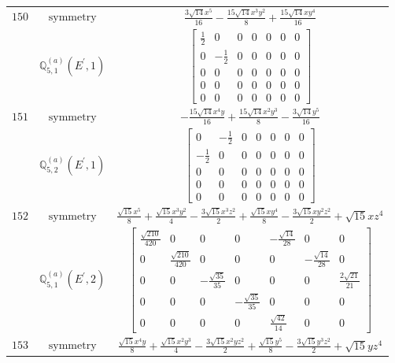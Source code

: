 \documentclass[fleqn,8pt,landscape]{jsarticle}
\begin{document}
\begin{longtable}{ccc}
$ 150 $ & $ \text{symmetry} $ & $ \frac{3 \sqrt{14} x^{5}}{16} - \frac{15 \sqrt{14} x^{3} y^{2}}{8} + \frac{15 \sqrt{14} x y^{4}}{16} $ \\
$  $ & $ \mathbb{Q}_{5,1}^{(a)}(E^{\prime},1) $ & $ \begin{bmatrix} \frac{1}{2} & 0 & 0 & 0 & 0 & 0 & 0 \\ 0 & - \frac{1}{2} & 0 & 0 & 0 & 0 & 0 \\ 0 & 0 & 0 & 0 & 0 & 0 & 0 \\ 0 & 0 & 0 & 0 & 0 & 0 & 0 \\ 0 & 0 & 0 & 0 & 0 & 0 & 0 \end{bmatrix} $ \\ \hline
$ 151 $ & $ \text{symmetry} $ & $ - \frac{15 \sqrt{14} x^{4} y}{16} + \frac{15 \sqrt{14} x^{2} y^{3}}{8} - \frac{3 \sqrt{14} y^{5}}{16} $ \\
$  $ & $ \mathbb{Q}_{5,2}^{(a)}(E^{\prime},1) $ & $ \begin{bmatrix} 0 & - \frac{1}{2} & 0 & 0 & 0 & 0 & 0 \\ - \frac{1}{2} & 0 & 0 & 0 & 0 & 0 & 0 \\ 0 & 0 & 0 & 0 & 0 & 0 & 0 \\ 0 & 0 & 0 & 0 & 0 & 0 & 0 \\ 0 & 0 & 0 & 0 & 0 & 0 & 0 \end{bmatrix} $ \\ \hline
$ 152 $ & $ \text{symmetry} $ & $ \frac{\sqrt{15} x^{5}}{8} + \frac{\sqrt{15} x^{3} y^{2}}{4} - \frac{3 \sqrt{15} x^{3} z^{2}}{2} + \frac{\sqrt{15} x y^{4}}{8} - \frac{3 \sqrt{15} x y^{2} z^{2}}{2} + \sqrt{15} x z^{4} $ \\
$  $ & $ \mathbb{Q}_{5,1}^{(a)}(E^{\prime},2) $ & $ \begin{bmatrix} \frac{\sqrt{210}}{420} & 0 & 0 & 0 & - \frac{\sqrt{14}}{28} & 0 & 0 \\ 0 & \frac{\sqrt{210}}{420} & 0 & 0 & 0 & - \frac{\sqrt{14}}{28} & 0 \\ 0 & 0 & - \frac{\sqrt{35}}{35} & 0 & 0 & 0 & \frac{2 \sqrt{21}}{21} \\ 0 & 0 & 0 & - \frac{\sqrt{35}}{35} & 0 & 0 & 0 \\ 0 & 0 & 0 & 0 & \frac{\sqrt{42}}{14} & 0 & 0 \end{bmatrix} $ \\ \hline
$ 153 $ & $ \text{symmetry} $ & $ \frac{\sqrt{15} x^{4} y}{8} + \frac{\sqrt{15} x^{2} y^{3}}{4} - \frac{3 \sqrt{15} x^{2} y z^{2}}{2} + \frac{\sqrt{15} y^{5}}{8} - \frac{3 \sqrt{15} y^{3} z^{2}}{2} + \sqrt{15} y z^{4} $ \\

\end{longtable}
\end{document}
